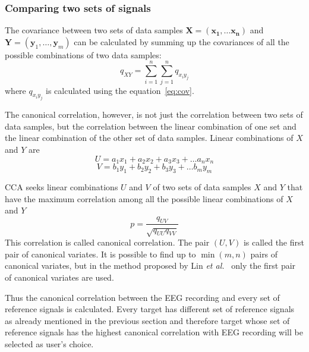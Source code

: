 \subsubsection{Comparing two sets of signals}

The covariance between two sets of data samples $\mathbf{X}=(\mathbf{x_1},\dots\mathbf{x_n})$ and $\mathbf{Y}=(\mathbf{y}_1,\dots,\mathbf{y}_m)$ can be calculated by summing up the covariances of all the possible combinations of two data samples:
\begin{equation}
	q_{XY} = \sum_{i=1}^{n}\sum_{j=1}^{n}q_{x_iy_j}
\end{equation}
where $q_{x_iy_j}$ is calculated using the equation~\ref{eq:cov}.

The canonical correlation, however, is not just the correlation between two sets of data samples, but the correlation between the linear combination of one set and the linear combination of the other set of data samples. Linear combinations of $X$ and $Y$ are
\begin{equation*}
	U = a_1x_1 + a_2x_2 + a_3x_3 + \dots a_nx_n
\end{equation*}
\begin{equation*}
	V = b_1y_1 + b_2y_2 + b_3y_3 + \dots b_my_m
\end{equation*}

\gls{CCA} seeks linear combinations $U$ and $V$ of two sets of data samples $X$ and $Y$ that have the maximum correlation among all the possible linear combinations of $X$ and $Y$
\begin{equation}
	p = \frac{q_{UV}}{\sqrt{q_{UU}q_{VV}}}
\end{equation}
This correlation is called canonical correlation. The pair $(U, V)$ is called the first pair of canonical variates. It is possible to find up to $\min(m, n)$ pairs of canonical variates, but in the method proposed by Lin \textit{et al.}~\cite{cca_lin} only the first pair of canonical variates are used.

Thus the canonical correlation between the \gls{EEG} recording and every set of reference signals is calculated. Every target has different set of reference signals as already mentioned in the previous section and therefore target whose set of reference signals has the highest canonical correlation with \gls{EEG} recording will be selected as user's choice.
